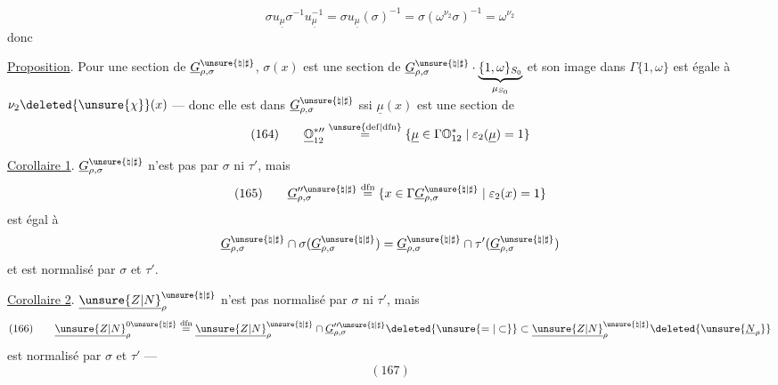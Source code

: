 \[
\sigma u_{\underline\mu}\sigma^{-1}u_{\underline\mu}^{-1}
=\sigma u_{\underline\mu}(\sigma)^{-1}
=\sigma(\omega^{\nu_2}\sigma)^{-1}=\omega^{\nu_2}
\]
donc

\uline{Proposition}. Pour une section  de $\underline G_{\rho,\sigma}^{\unsure{\natural|\sharp}}$, \deleted{$\unsure{\sigma}$}
$\sigma(x)$ est une section de $\underline G_{\rho,\sigma}^{\unsure{\natural|\sharp}}\cdot\underbrace{\{1,\omega\}_{S_0}}_{\mu_{S_0}}$ et son image dans $\Gamma\{1,\omega\}$ est égale à $\nu_2\deleted{\unsure{\chi}}(x)$ --- donc elle est dans $\underline G_{\rho,\sigma}^{\unsure{\natural|\sharp}}$ ssi $\underline\mu(x)$ est une section de
\[
(164)\qquad
\underline{\mathbb O}_{12}^{*\prime\prime}
\overset{\unsure{\mathrm{def}|\mathrm{dfn}}}{=}
\{\underline\mu\in\Gamma\mathbb O_{12}^*\mid\varepsilon_2(\underline\mu)=1\}
\]

\uline{Corollaire 1}. $\underline G_{\rho,\sigma}^{\unsure{\natural|\sharp}}$ n'est pas  par $\sigma$ ni $\tau'$, mais
\[
(165)\qquad
\underline G_{\rho,\sigma}^{\prime\prime\unsure{\natural|\sharp}}
\overset{\mathrm{dfn}}{=}
\{x\in\Gamma\underline G_{\rho,\sigma}^{\unsure{\natural|\sharp}}\mid\varepsilon_2(x)=1\}
\]
est égal à
\[
\underline G_{\rho,\sigma}^{\unsure{\natural|\sharp}}
\cap\sigma(\underline G_{\rho,\sigma}^{\unsure{\natural|\sharp}})
=\underline G_{\rho,\sigma}^{\unsure{\natural|\sharp}}
\cap\tau'(\underline G_{\rho,\sigma}^{\unsure{\natural|\sharp}})
\]
et est normalisé par $\sigma$ et $\tau'$.

\uline{Corollaire 2}. $\underline{\unsure{Z|N}}_\rho^{\unsure{\natural|\sharp}}$ n'est pas normalisé par $\sigma$ ni $\tau'$, mais
\[
(166)\qquad
\underline{\unsure{Z|N}}_\rho^{0\unsure{\natural|\sharp}}
\overset{\mathrm{dfn}}{=}
\underline{\unsure{Z|N}}_\rho^{\unsure{\natural|\sharp}}
\cap\underline G_{\rho,\sigma}^{\prime\prime\unsure{\natural|\sharp}}
\deleted{\unsure{=|\subset}}
\subset\underline{\unsure{Z|N}}_\rho^{\unsure{\natural|\sharp}}
\deleted{\unsure{\underline N_\rho}}
\]
est normalisé par $\sigma$ et $\tau'$ --- 
\[
(167)
\]

